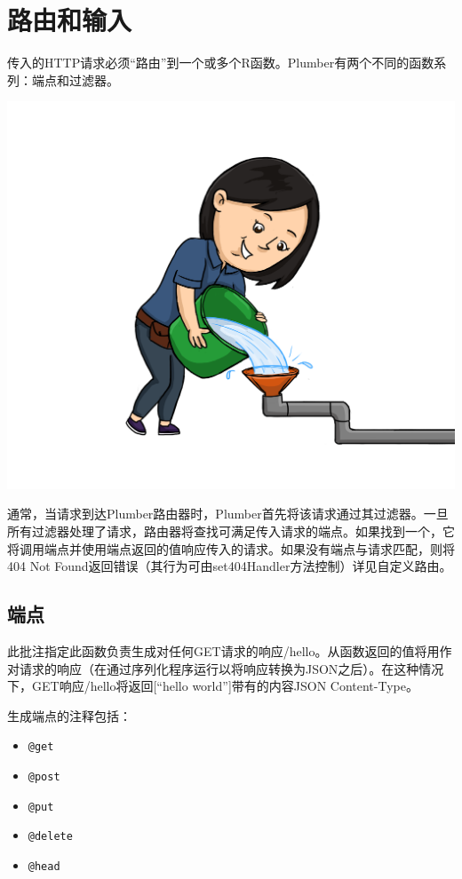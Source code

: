 \documentclass[]{book}
\begin{document}
\section{路由和输入}

传入的HTTP请求必须``路由''到一个或多个R函数。Plumber有两个不同的函数系列：端点和过滤器。

\includegraphics{pic/plumber/p3.png}

通常，当请求到达Plumber路由器时，Plumber首先将该请求通过其过滤器。一旦所有过滤器处理了请求，路由器将查找可满足传入请求的端点。如果找到一个，它将调用端点并使用端点返回的值响应传入的请求。如果没有端点与请求匹配，则将404
Not Found返回错误（其行为可由set404Handler方法控制）详见自定义路由。

\subsection{端点}

此批注指定此函数负责生成对任何GET请求的响应/hello。从函数返回的值将用作对请求的响应（在通过序列化程序运行以将响应转换为JSON之后）。在这种情况下，GET响应/hello将返回{[}``hello
world''{]}带有的内容JSON Content-Type。

生成端点的注释包括：

\begin{itemize}
\item
  \texttt{@get}
\item
  \texttt{@post}
\item
  \texttt{@put}
\item
  \texttt{@delete}
\item
  \texttt{@head}
\end{itemize}
\end{document}
